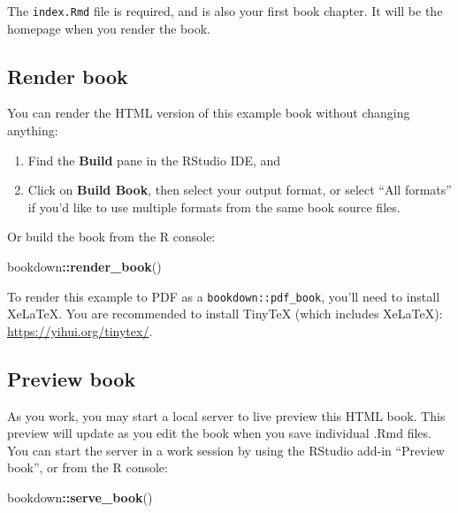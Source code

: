 \documentclass[
  xelatex, ja=standard]{bxjsbook}
\newenvironment{Shaded}{\begin{snugshade}}{\end{snugshade}}
\newcommand{\FunctionTok}[1]{\textcolor[rgb]{0.13,0.29,0.53}{\textbf{#1}}}
\newcommand{\NormalTok}[1]{#1}
\newcommand{\SpecialCharTok}[1]{\textcolor[rgb]{0.81,0.36,0.00}{\textbf{#1}}}
\theoremstyle{definition}
\theoremstyle{definition}
\theoremstyle{definition}
\theoremstyle{definition}
\theoremstyle{remark}
\begin{document}
The \texttt{index.Rmd} file is required, and is also your first book chapter. It will be the homepage when you render the book.

\hypertarget{render-book}{%
\subsection{Render book}\label{render-book}}

You can render the HTML version of this example book without changing anything:

\begin{enumerate}
\def\labelenumi{\arabic{enumi}.}
\item
  Find the \textbf{Build} pane in the RStudio IDE, and
\item
  Click on \textbf{Build Book}, then select your output format, or select ``All formats'' if you'd like to use multiple formats from the same book source files.
\end{enumerate}

Or build the book from the R console:

\begin{Shaded}
\begin{Highlighting}[]
\NormalTok{bookdown}\SpecialCharTok{::}\FunctionTok{render\_book}\NormalTok{()}
\end{Highlighting}
\end{Shaded}

To render this example to PDF as a \texttt{bookdown::pdf\_book}, you'll need to install XeLaTeX. You are recommended to install TinyTeX (which includes XeLaTeX): \url{https://yihui.org/tinytex/}.

\hypertarget{preview-book}{%
\subsection{Preview book}\label{preview-book}}

As you work, you may start a local server to live preview this HTML book. This preview will update as you edit the book when you save individual .Rmd files. You can start the server in a work session by using the RStudio add-in ``Preview book'', or from the R console:

\begin{Shaded}
\begin{Highlighting}[]
\NormalTok{bookdown}\SpecialCharTok{::}\FunctionTok{serve\_book}\NormalTok{()}
\end{Highlighting}
\end{Shaded}
\end{document}
